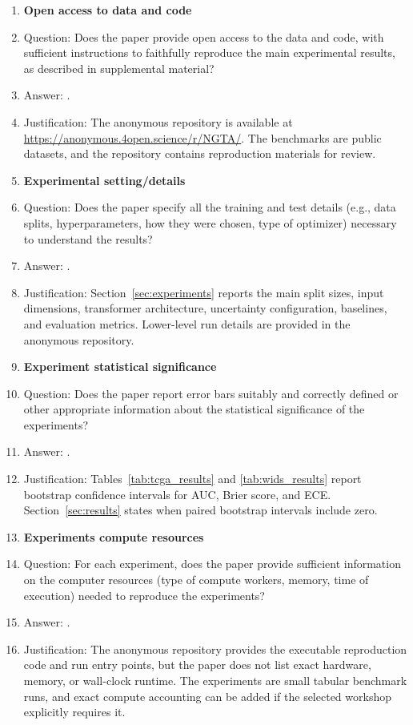 \begin{enumerate}
\item {\bf Open access to data and code}
    \item[] Question: Does the paper provide open access to the data and code, with sufficient instructions to faithfully reproduce the main experimental results, as described in supplemental material?
    \item[] Answer: \answerYes{}.
    \item[] Justification: The anonymous repository is available at \url{https://anonymous.4open.science/r/NGTA/}. The benchmarks are public datasets, and the repository contains reproduction materials for review.

\item {\bf Experimental setting/details}
    \item[] Question: Does the paper specify all the training and test details (e.g., data splits, hyperparameters, how they were chosen, type of optimizer) necessary to understand the results?
    \item[] Answer: \answerYes{}.
    \item[] Justification: Section~\ref{sec:experiments} reports the main split sizes, input dimensions, transformer architecture, uncertainty configuration, baselines, and evaluation metrics. Lower-level run details are provided in the anonymous repository.

\item {\bf Experiment statistical significance}
    \item[] Question: Does the paper report error bars suitably and correctly defined or other appropriate information about the statistical significance of the experiments?
    \item[] Answer: \answerYes{}.
    \item[] Justification: Tables~\ref{tab:tcga_results} and \ref{tab:wids_results} report bootstrap confidence intervals for AUC, Brier score, and ECE. Section~\ref{sec:results} states when paired bootstrap intervals include zero.

\item {\bf Experiments compute resources}
    \item[] Question: For each experiment, does the paper provide sufficient information on the computer resources (type of compute workers, memory, time of execution) needed to reproduce the experiments?
    \item[] Answer: \answerNo{}.
    \item[] Justification: The anonymous repository provides the executable reproduction code and run entry points, but the paper does not list exact hardware, memory, or wall-clock runtime. The experiments are small tabular benchmark runs, and exact compute accounting can be added if the selected workshop explicitly requires it.


\end{enumerate}
